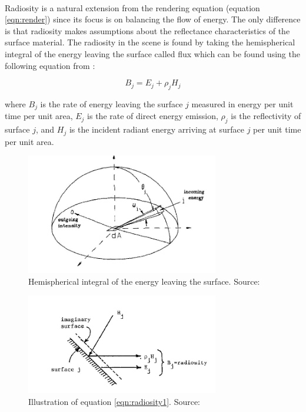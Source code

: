 \paragraph{}
Radiosity is a natural extension from the rendering equation (equation \ref{eqn:render}) since its focus is on balancing the flow of energy.  The only difference is that radiosity makes assumptions about the reflectance characteristics of the surface material.  The radiosity in the scene is found by taking the hemispherical integral of the energy leaving the surface called flux which can be found using the following equation from \cite{Goral1984}:

\begin{equation}
B_{j} = E_{j} + \rho_{j}H_{j} \label{eqn:radiosity1}
\end{equation}

where $B_{j}$ is the rate of energy leaving the surface $j$ measured in energy per unit time per unit area, $E_{j}$ is the rate of direct energy emission,  $\rho_{j}$ is the reflectivity of surface $j$, and $H_{j}$ is the incident radiant energy arriving at surface $j$ per unit time per unit area.

\begin{figure}[h!]
  \centering
    \includegraphics[width=0.75\textwidth]{radiosityCalc1.jpg}
  \caption{Hemispherical integral of the energy leaving the surface. Source: \protect\cite{Immel1986}}
	\label{fig:radiosityCalc1}
\end{figure}

\begin{figure}[h!]
  \centering
    \includegraphics[width=0.75\textwidth]{radiosityCalc2.jpg}
  \caption{Illustration of equation \ref{eqn:radiosity1}. Source: \protect\cite{Goral1984}}
	\label{fig:radiosityCalc2}
\end{figure}

